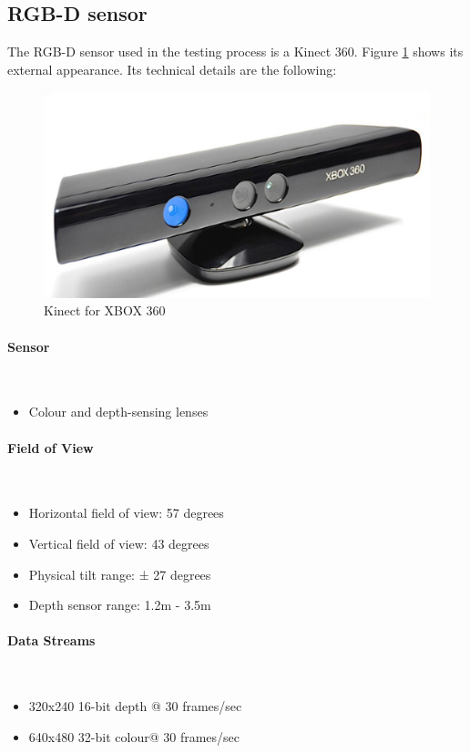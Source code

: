 \subsection{RGB-D sensor}
	The RGB-D sensor used in the testing process is a Kinect 360. 
	Figure \ref{kinect_image} shows its external appearance. 
	Its technical details are the following: 
	\begin{figure}[H]
		\begin{center}
	\includegraphics[scale=0.3]{img/kinect.eps}
		\caption[Kinect image]{Kinect for XBOX 360}
		\end{center}
		\label{kinect_image}
	\end{figure}
	\paragraph{ Sensor} \mbox{} \\
		\begin{itemize}
			\item Colour and depth-sensing lenses
		\end{itemize}
		\vspace*{0.5cm}

	\paragraph{ Field of View} \mbox{} \\
		\begin{itemize}

			\item Horizontal field of view: 57 degrees
			\item Vertical field of view: 43 degrees
			\item Physical tilt range: ± 27 degrees
			\item Depth sensor range: 1.2m - 3.5m
		\end{itemize}
		\vspace*{0.5cm}

	\paragraph{ Data Streams} \mbox{} \\
		\begin{itemize}

			\item 320x240 16-bit depth @ 30 frames/sec
			\item 640x480 32-bit colour@ 30 frames/sec
		\end{itemize}
		\vspace*{0.5cm}
